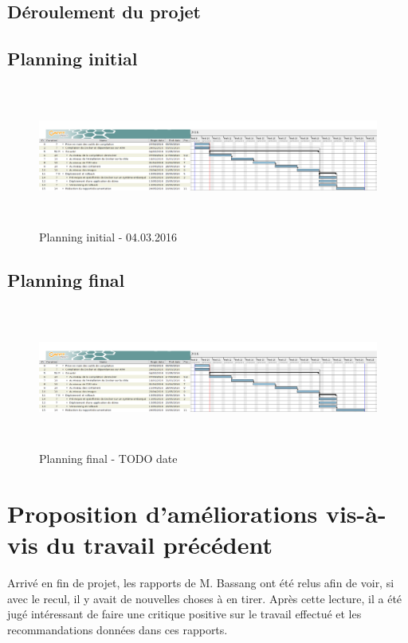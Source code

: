 \documentclass[11pt,a4paper,oneside]{report}
\begin{document}
\begin{landscape}
\chapter{Déroulement du projet}


\section{Planning initial}
\begin{figure}[ht]
\centering
\includegraphics[height=4.7cm]{img/initial_planning.png}
\caption{Planning initial - 04.03.2016}
\end{figure}


\section{Planning final}
\begin{figure}[ht]
\centering
\includegraphics[draft,height=4.7cm]{img/initial_planning.png}
\caption{Planning final - TODO date}
\end{figure}

\end{landscape}


\chapter{Proposition d'améliorations vis-à-vis du travail précédent}
Arrivé en fin de projet, les rapports de M. Bassang ont été relus afin de voir, si avec le recul, il y avait de nouvelles choses à en tirer. Après cette lecture, il a été jugé intéressant de faire une critique positive sur le travail effectué et les recommandations données dans ces rapports. 
\end{document}
